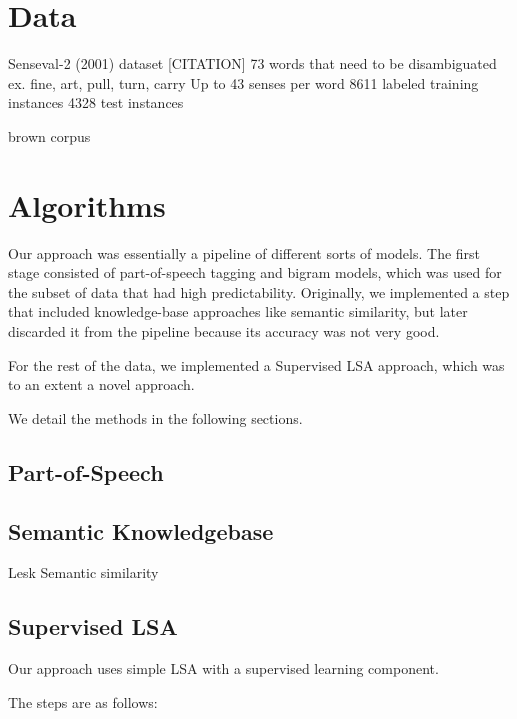 \documentclass[10pt, letterpaper]{article}
\begin{document}
	\section{Data}
	Senseval-2 (2001) dataset [CITATION]
	73 words that need to be disambiguated
	         ex. fine, art, pull, turn, carry
	Up to 43 senses per word
	8611 labeled training instances
	4328 test instances	

	brown corpus

	\section{Algorithms}
	 Our approach was essentially a pipeline of different sorts of models. 
	 The first stage consisted of part-of-speech tagging and bigram models, which
	 was used for the subset of data that had high predictability. 
	 Originally, we implemented a step that included knowledge-base approaches like
	 semantic similarity, but later discarded it from the pipeline because its accuracy
	 was not very good. 

	 For the rest of the data, we implemented a Supervised LSA approach, which was to
	 an extent a novel approach. 

	 We detail the methods in the following sections. 
 	\subsection{Part-of-Speech}
 	\subsection{Semantic Knowledgebase}
        Lesk
        Semantic similarity
	\subsection{Supervised LSA}
	Our approach uses simple LSA with a supervised learning component. 

	The steps are as follows: 
\end{document}

